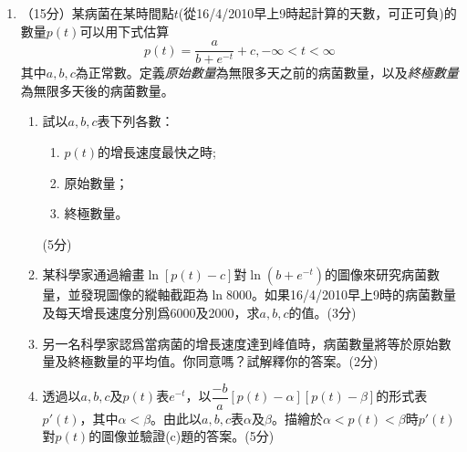 \documentclass[12pt]{article}
\begin{document}
\begin{enumerate}
        \hrulefill

        \hrulefill

        \hrulefill

        \hrulefill

        \hrulefill

        \hrulefill

        \hrulefill

        \hrulefill

        \hrulefill

        \hrulefill

        \hrulefill

        \hrulefill

        \hrulefill

        \hrulefill

        \hrulefill

        \hrulefill

        \hrulefill

        \hrulefill

        \hrulefill
        \item （15分）某病菌在某時間點$t$(從16/4/2010早上9時起計算的天數，可正可負)的數量$p(t)$可以用下式估算$$p(t)=\frac{a}{b+e^{-t}}+c, -\infty<t<\infty$$其中$a,b,c$為正常數。定義\textit{原始數量}為無限多天之前的病菌數量，以及\textit{終極數量}為無限多天後的病菌數量。\begin{enumerate}
            \item 試以$a,b,c$表下列各數：\begin{enumerate}
                \item $p(t)$的增長速度最快之時;
                \item 原始數量；
                \item 終極數量。
            \end{enumerate}\hfill(5分)
            \item 某科學家通過繪畫$\ln[p(t)-c]$對$\ln(b+e^{-t})$的圖像來研究病菌數量，並發現圖像的縱軸截距為$\ln 8000$。如果16/4/2010早上9時的病菌數量及每天增長速度分別爲6000及2000，求$a,b,c$的值。\hfill(3分)
            \item 另一名科學家認爲當病菌的增長速度達到峰值時，病菌數量將等於原始數量及終極數量的平均值。你同意嗎？試解釋你的答案。\hfill(2分)
            \item 透過以$a,b,c$及$p(t)$表$e^{-t}$，以$\dfrac{-b}{a}[p(t)-\alpha][p(t)-\beta]$的形式表$p'(t)$，其中$\alpha<\beta$。由此以$a,b,c$表$\alpha$及$\beta$。描繪於$\alpha<p(t)<\beta$時$p'(t)$對$p(t)$的圖像並驗證(c)題的答案。\hfill(5分)
        \end{enumerate}


\end{enumerate}
\end{document}
